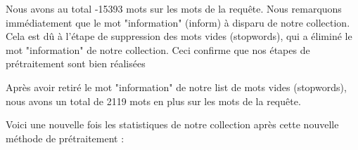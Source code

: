 \documentclass[a4paper, 12pt]{article}
\begin{document}
\begin{table}[!h]
    \centering
    \caption{Fréquence des mots des requêtes (Partie 2)}
\end{table}
Nous avons au total -15393 mots sur les mots de la requête. Nous remarquons immédiatement que le mot "information" (inform) à disparu de notre collection.
Cela est dû à l'étape de suppression des mots vides (stopwords), qui a éliminé le mot "information" de notre collection.
Ceci confirme que nos étapes de prétraitement sont bien réalisées 

Après avoir retiré le mot "information" de notre list de mots vides (stopwords), 
nous avons un total de 2119 mots en plus sur les mots de la requête.

Voici une nouvelle fois les statistiques de notre collection après cette nouvelle méthode de prétraitement :
\end{document}
